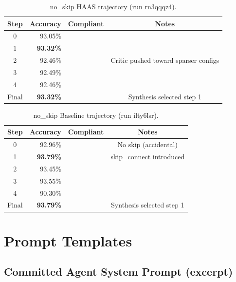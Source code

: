 \documentclass[10pt]{article}
\newcommand{\cmark}{\ding{51}}
\newcommand{\xmark}{\ding{55}}
\begin{document}
\begin{table}[H]
\caption{no\_skip HAAS trajectory (run rn3qqqz4).}
\begin{center}
\small
\begin{tabular}{crcc}
\toprule
Step & Accuracy & Compliant & Notes \\
\midrule
0     & 93.05\% & \cmark &\\
1     & \textbf{93.32\%} & \cmark &\\
2     & 92.46\% & \cmark &Critic pushed toward sparser configs \\
3     & 92.49\% & \cmark &\\
4     & 92.46\% & \cmark &\\
Final & \textbf{93.32\%} & \cmark &Synthesis selected step 1 \\
\bottomrule
\end{tabular}
\end{center}
\end{table}

\begin{table}[H]
\caption{no\_skip Baseline trajectory (run ilty6lsr).}
\begin{center}
\small
\begin{tabular}{crcc}
\toprule
Step & Accuracy & Compliant & Notes \\
\midrule
0     & 92.96\% & \cmark &No skip (accidental) \\
1     & \textbf{93.79\%} & \xmark & skip\_connect introduced \\
2     & 93.45\% & \cmark &\\
3     & 93.55\% & \xmark & \\
4     & 90.30\% & \xmark & \\
Final & \textbf{93.79\%} & \xmark & Synthesis selected step 1 \\
\bottomrule
\end{tabular}
\end{center}
\end{table}

\section{Prompt Templates}
\label{app:prompts}

\subsection{Committed Agent System Prompt (excerpt)}
\end{document}
